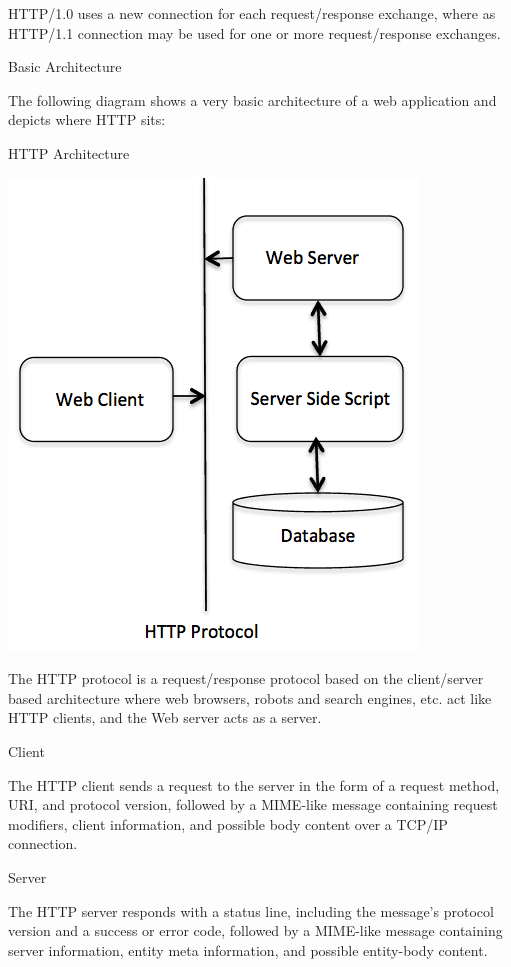 \documentclass[a4paper,11pt]{extarticle}
\begin{document}
    HTTP/1.0 uses a new connection for each request/response exchange, where as HTTP/1.1 connection may be used for one or more request/response exchanges.

Basic Architecture

The following diagram shows a very basic architecture of a web application and
depicts where HTTP sits:

HTTP Architecture

{\centering
\includegraphics[scale=1.0]{images/cgiarch.png}
}

The HTTP protocol is a request/response protocol based on the client/server based architecture 
where web browsers, robots and search engines, etc. act like HTTP clients, and the Web server 
acts as a server.

Client

The HTTP client sends a request to the server in the form of a request method, URI, and protocol 
version, followed by a MIME-like message containing request modifiers, client information, and 
possible body content over a TCP/IP connection.

Server

The HTTP server responds with a status line, including the message's protocol version and a 
success or error code, followed by a MIME-like message containing server information, entity meta 
information, and possible entity-body content.
\end{document}
